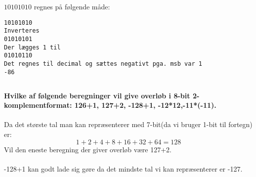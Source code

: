 \documentclass[a4paper,11pt]{article}
\begin{document}
$10101010$ regnes på følgende måde:\\
\begin{verbatim}
10101010
Inverteres
01010101
Der lægges 1 til
01010110
Det regnes til decimal og sættes negativt pga. msb var 1
-86
\end{verbatim}

\subsection*{}
\textbf{Hvilke af følgende beregninger vil give overløb i 8-bit 2-komplementformat: 126+1, 127+2, -128+1, -12*12,-11*(-11).}
\\\\
Da det største tal man kan repræsenterer med 7-bit(da vi bruger 1-bit til fortegn) er:
$$1+2+4+8+16+32+64=128$$
Vil den eneste beregning der giver overløb være 127+2.\\
\\
-128+1 kan godt lade sig gøre da det mindste tal vi kan repræsenterer er -127.
\end{document}
